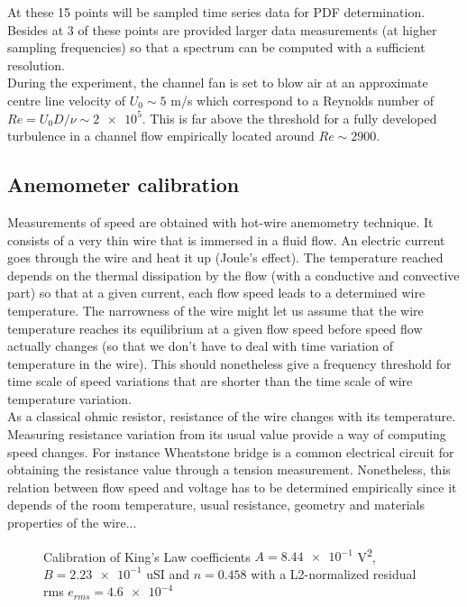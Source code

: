 \documentclass[12pt]{article}
\begin{document}
At these 15 points will be sampled time series data for PDF determination. Besides at 3 of these points are provided larger data measurements (at higher sampling frequencies) so that a spectrum can be computed with a sufficient resolution.\\

During the experiment, the channel fan is set to blow air at an approximate centre line velocity of $U_0 \sim 5$ \si{m/s} which correspond to a Reynolds number of $Re = U_0 D/\nu \sim \num{2e5}$. This is far above the threshold for a fully developed turbulence in a channel flow empirically located around $Re \sim 2900$. 


\subsection{Anemometer calibration}

Measurements of speed are obtained with hot-wire anemometry technique. It consists of a very thin wire that is immersed in a fluid flow. An electric current goes through the wire and heat it up (Joule's effect). The temperature reached depends on the thermal dissipation by the flow (with a conductive and convective part) so that at a given current, each flow speed leads to a determined wire temperature. The narrowness of the wire might let us assume that the wire temperature reaches its equilibrium at a given flow speed before speed flow actually changes (so that we don't have to deal with time variation of temperature in the wire). This should nonetheless give a frequency threshold for time scale of speed variations that are shorter than the time scale of wire temperature variation.\\

As a classical ohmic resistor, resistance of the wire changes with its temperature. Measuring resistance variation from its usual value provide a way of computing speed changes. For instance Wheatstone bridge is a common electrical circuit for obtaining the resistance value through a tension measurement. Nonetheless, this relation between flow speed and voltage has to be determined empirically since it depends of the room temperature, usual resistance, geometry and materials properties of the wire...\\

\begin{figure}[ht!]
    \centering
    \resizebox{0.6\linewidth}{!}{}
    \caption{Calibration of King's Law coefficients $A = \num{8.44e-1}$ \si{V^2}, $B = \num{2.23e-1}$ \si{uSI} and $n=0.458$ with a L2-normalized residual rms $e_{rms} = \num{4.6e-4}$}
    \label{fig:AnemometerFitting}
\end{figure}
\end{document}
